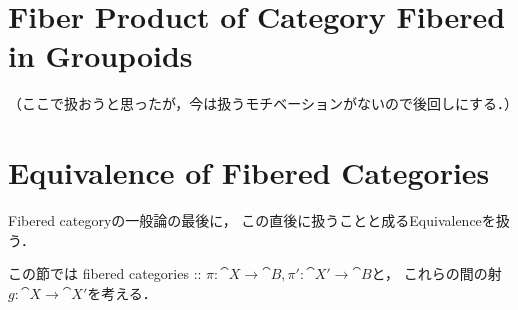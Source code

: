 \documentclass[a4paper, dvipdfmx]{jsarticle}
\begin{document}


\section{Fiber Product of Category Fibered in Groupoids}
    （ここで扱おうと思ったが，今は扱うモチベーションがないので後回しにする．）

\section{Equivalence of Fibered Categories}
    Fibered categoryの一般論の最後に，
    この直後に扱うことと成るEquivalenceを扱う．
    
    この節では
    fibered categories :: $\pi \colon \cat{X} \to \cat{B}, \pi' \colon \cat{X}' \to \cat{B}$と，
    これらの間の射$g \colon \cat{X} \to \cat{X}'$を考える．
\end{document}
